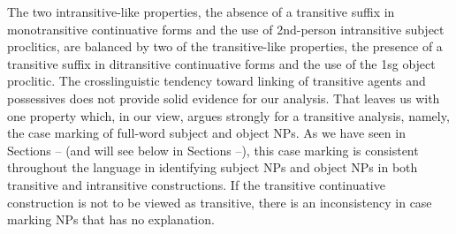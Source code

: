 \documentclass[output=paper,colorlinks,citecolor=brown]{langscibook}
\begin{document}
The two intransitive-like properties, the absence of a transitive
suffix in monotransitive continuative forms and the use of 2nd-person
intransitive subject proclitics, are balanced by two of the
transitive-like properties, the presence of a transitive suffix in
ditransitive continuative forms and the use of the 1sg object
proclitic.  The crosslinguistic tendency toward linking of transitive
agents and possessives does not provide solid evidence for our
analysis.  That leaves us with one property which, in our view, argues
strongly for a transitive analysis, namely, the case marking of
full-word subject and object NPs.  As we have seen in Sections -- (and
will see below in Sections --), this case marking is consistent
throughout the language in identifying subject NPs and object NPs in
both transitive and intransitive constructions.  If the transitive
continuative construction is not to be viewed as transitive, there is
an inconsistency in case marking NPs that has no explanation.
\end{document}
